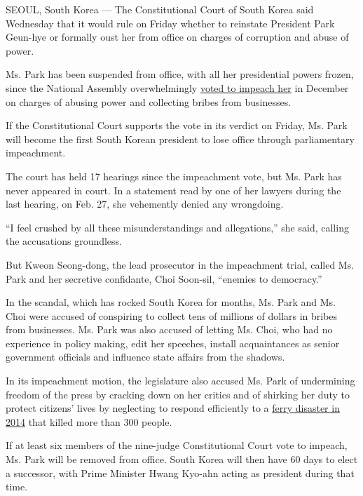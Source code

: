SEOUL, South Korea --- The Constitutional Court of South Korea said
Wednesday that it would rule on Friday whether to reinstate President
Park Geun-hye or formally oust her from office on charges of corruption
and abuse of power.

Ms. Park has been suspended from office, with all her presidential
powers frozen, since the National Assembly overwhelmingly
\href{https://www.nytimes3xbfgragh.onion/2016/12/09/world/asia/south-korea-president-park-geun-hye-impeached.html}{voted
to impeach her} in December on charges of abusing power and collecting
bribes from businesses.

If the Constitutional Court supports the vote in its verdict on Friday,
Ms. Park will become the first South Korean president to lose office
through parliamentary impeachment.

The court has held 17 hearings since the impeachment vote, but Ms. Park
has never appeared in court. In a statement read by one of her lawyers
during the last hearing, on Feb. 27, she vehemently denied any
wrongdoing.

``I feel crushed by all these misunderstandings and allegations,'' she
said, calling the accusations groundless.

But Kweon Seong-dong, the lead prosecutor in the impeachment trial,
called Ms. Park and her secretive confidante, Choi Soon-sil, ``enemies
to democracy.''

In the scandal, which has rocked South Korea for months, Ms. Park and
Ms. Choi were accused of conspiring to collect tens of millions of
dollars in bribes from businesses. Ms. Park was also accused of letting
Ms. Choi, who had no experience in policy making, edit her speeches,
install acquaintances as senior government officials and influence state
affairs from the shadows.

In its impeachment motion, the legislature also accused Ms. Park of
undermining freedom of the press by cracking down on her critics and of
shirking her duty to protect citizens' lives by neglecting to respond
efficiently to a
\href{https://www.nytimes3xbfgragh.onion/2014/04/21/world/asia/chaos-ruled-sinking-ferry.html}{ferry
disaster in 2014} that killed more than 300 people.

If at least six members of the nine-judge Constitutional Court vote to
impeach, Ms. Park will be removed from office. South Korea will then
have 60 days to elect a successor, with Prime Minister Hwang Kyo-ahn
acting as president during that time.


